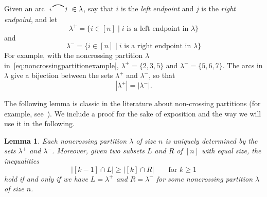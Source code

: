 \documentclass[12pt]{amsart}
\newtheorem{lem}[equation]{Lemma}
\theoremstyle{definition}
\theoremstyle{remark}
\numberwithin{equation}{section}
\newcommand{\edge}[2]{\tikz[scale = 0.75, baseline = -0.2cm]{
\draw (0.1, 0) node[inner sep = 0ex] (a) {};
\node[left, xshift = 0.1cm, yshift = -0.1cm] at (a) {$\scriptstyle #1$};
\draw (0.9, 0)  node[inner sep = 0ex] (b) {};
\node[right, xshift = -0.1cm, yshift = -0.1cm] at (b) {$\scriptstyle #2$};
\draw[thick] (a) to[out = 35, in = 145] (b);}}
\begin{document}
Given an arc $ \edge{i}{j} \in \lambda$, say that $i$ is the \emph{left endpoint} and $j$ is the \emph{right endpoint}, and let
\[
\lambda^{+} = \{ i \in [n] \;|\; \text{$i$ is a left endpoint in $\lambda$} \}
\]
and
\[
\lambda^{-} = \{ i \in [n] \;|\; \text{$i$ is a right endpoint in $\lambda$} \}
\]
For example, with the noncrossing partition $\lambda$ in~\eqref{eq:noncrossingpartitionexample}, $\lambda^{+} = \{2, 3, 5\}$ and $\lambda^{-} = \{5, 6, 7\}$.  The arcs in $\lambda$ give a bijection between the sets $\lambda^{+}$ and $\lambda^{-}$, so that
\[
|\lambda^{+}| = |\lambda^{-}|.
\]

The following lemma is classic in the literature about non-crossing partitions (for example, see~\cite{Stanley}). We include a proof for the sake of exposition and the way we will use it in the following.
\begin{lem}
\label{lem:noncrossingpartitionproperty}
Each noncrossing partition $\lambda$ of size $n$ is uniquely determined by the sets $\lambda^{+}$ and $\lambda^{-}$.  Moreover, given two subsets $L$ and $R$ of $[n]$ with equal size, the inequalities
\[
|[k-1] \cap L| \ge |[k] \cap R| \qquad\text{for $k \ge 1$}
\]
hold if and only if we have $L = \lambda^{+}$ and $R = \lambda^{-}$ for some noncrossing partition $\lambda$ of size $n$.
\end{lem}
\end{document}
